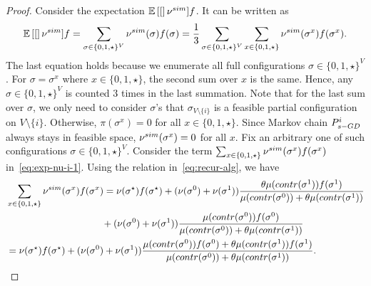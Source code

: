 \documentclass[10pt,a4paper]{amsart}
\newcommand{\E}[1]{\mathbb{E}\left[{#1}\right]}
\newcommand{\nus}{\nu^{\textnormal{sim}}}
\begin{document}
\begin{proof}
Consider the expectation $\E[\nus]{f}$. It can be written as
\begin{align}\label{eq:exp-nu-i-1}
\E[\nus]{f}=\sum_{\sigma\in \{0,1,\star\}^V} \nus(\sigma)f(\sigma)=\frac{1}{3} \sum_{\sigma\in \{0,1,\star\}^V}\sum_{x\in\{0,1,\star\} } \nus(\sigma^x)f(\sigma^x). 
\end{align}
The last equation holds because we enumerate all full configurations $\sigma \in \{0,1,\star\}^V$. For $\sigma = \sigma^{x}$ where $x\in \{0,1,\star\}$, the second sum over $x$ is the same. Hence, any $\sigma \in \{0,1,\star\}^V$ is counted $3$ times in the last summation.
Note that for the last sum over $\sigma$, we only need to consider $\sigma$'s that $\sigma_{V \setminus \{i\}}$ is a feasible partial configuration on $V \setminus \{i\}$. Otherwise, $\pi(\sigma^x) = 0$ for all $x\in \{0,1,\star\}$. Since Markov chain $P^i_{s\textnormal{-GD}}$ always stays in feasible space, $\nus(\sigma^x) = 0$ for all $x$.
Fix an arbitrary one of such configurations $\sigma \in \{0,1,\star\}^V$. Consider the term $\sum_{x\in \{0,1,\star\}} \nus(\sigma^x)f(\sigma^x)$ in~\eqref{eq:exp-nu-i-1}.
Using the relation in~\eqref{eq:recur-alg}, we have
\begin{align}\label{eq:exp-nu-i}
&\sum_{x\in \{0,1,\star\}} \nus(\sigma^x)f(\sigma^x)= \nu(\sigma^\star) f(\sigma^\star)+(\nu(\sigma^0)+\nu(\sigma^1))\frac{\theta \mu(\textsf{contr}(\sigma^1))f(\sigma^1)}{\mu(\textsf{contr}(\sigma^0))+\theta \mu(\textsf{contr}(\sigma^1))}\notag\\
&\qquad\qquad\qquad\qquad\qquad+(\nu(\sigma^0)+\nu(\sigma^1))\frac{ \mu(\textsf{contr}(\sigma^0))f(\sigma^0)}{\mu(\textsf{contr}(\sigma^0))+\theta \mu(\textsf{contr}(\sigma^1))} \notag\\
&=\nu(\sigma^\star) f(\sigma^\star)+(\nu(\sigma^0)+\nu(\sigma^1))\frac{ \mu(\textsf{contr}(\sigma^0))f(\sigma^0)+\theta \mu(\textsf{contr}(\sigma^1))f(\sigma^1)}{\mu(\textsf{contr}(\sigma^0))+\theta \mu(\textsf{contr}(\sigma^1))}.  
\end{align}


\end{proof}
\end{document}
